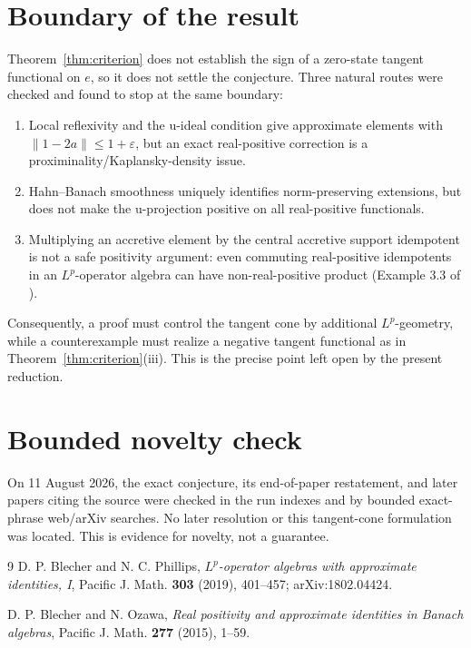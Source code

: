 \documentclass[11pt]{article}
\begin{document}
\section*{Boundary of the result}
Theorem~\ref{thm:criterion} does not establish the sign of a zero-state tangent
functional on $e$, so it does not settle the conjecture.  Three natural routes
were checked and found to stop at the same boundary:
\begin{enumerate}[leftmargin=2em]
\item Local reflexivity and the u-ideal condition give approximate elements
with $\|1-2a\|\leq1+\varepsilon$, but an exact real-positive correction is a
proximinality/Kaplansky-density issue.
\item Hahn--Banach smoothness uniquely identifies norm-preserving extensions,
but does not make the u-projection positive on all real-positive functionals.
\item Multiplying an accretive element by the central accretive support
idempotent is not a safe positivity argument: even commuting real-positive
idempotents in an $L^p$-operator algebra can have non-real-positive product
(Example 3.3 of \cite{Source}).
\end{enumerate}

Consequently, a proof must control the tangent cone by additional
$L^p$-geometry, while a counterexample must realize a negative tangent
functional as in Theorem~\ref{thm:criterion}(iii).  This is the precise point
left open by the present reduction.

\section*{Bounded novelty check}
On 11 August 2026, the exact conjecture, its end-of-paper restatement, and later
papers citing the source were checked in the run indexes and by bounded
exact-phrase web/arXiv searches.  No later resolution or this tangent-cone
formulation was located.  This is evidence for novelty, not a guarantee.

\begin{thebibliography}{9}
D. P. Blecher and N. C. Phillips,
\emph{$L^p$-operator algebras with approximate identities, I},
Pacific J. Math. \textbf{303} (2019), 401--457; arXiv:1802.04424.

D. P. Blecher and N. Ozawa,
\emph{Real positivity and approximate identities in Banach algebras},
Pacific J. Math. \textbf{277} (2015), 1--59.
\end{thebibliography}
\end{document}
